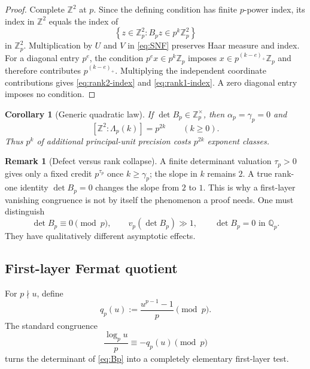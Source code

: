\documentclass[11pt,oneside]{article}
\newtheorem{corollary}[theorem]{Corollary}
\theoremstyle{definition}
\newtheorem{remark}[theorem]{Remark}
\newcommand{\Q}{\mathbb{Q}}
\newcommand{\Z}{\mathbb{Z}}
\newcommand{\set}[1]{\left\{#1\right\}}
\begin{document}
\begin{proof}
Complete $\Z^2$ at $p$.  Since the defining condition has finite
$p$-power index, its index in $\Z^2$ equals the index of
\[
  \set{z\in\Z_p^2:B_pz\in p^k\Z_p^2}
\]
in $\Z_p^2$.  Multiplication by $U$ and $V$ in
\eqref{eq:SNF} preserves Haar measure and index.  For a diagonal entry
$p^e$, the condition $p^ex\in p^k\Z_p$ imposes
$x\in p^{(k-e)_+}\Z_p$ and therefore contributes
$p^{(k-e)_+}$.  Multiplying the independent coordinate contributions
gives \eqref{eq:rank2-index} and \eqref{eq:rank1-index}.  A zero diagonal
entry imposes no condition.
\end{proof}

\begin{corollary}[Generic quadratic law]\label{cor:generic-quadratic}
If $\det B_p\in\Z_p^\times$, then $\alpha_p=\gamma_p=0$ and
\begin{equation}\label{eq:generic-index}
  [\Z^2:\Lambda_p(k)]=p^{2k}
  \qquad(k\ge0).
\end{equation}
Thus $p^k$ of additional principal-unit precision costs $p^{2k}$ exponent
classes.
\end{corollary}

\begin{remark}[Defect versus rank collapse]\label{rem:defect-rank}
A finite determinant valuation $\tau_p>0$ gives only a fixed credit
$p^{\tau_p}$ once $k\ge\gamma_p$; the slope in $k$ remains $2$.  A true
rank-one identity $\det B_p=0$ changes the slope from $2$ to $1$.  This is
why a first-layer vanishing congruence is not by itself the phenomenon a
proof needs.  One must distinguish
\[
  \det B_p\equiv0\pmod p,
  \qquad v_p(\det B_p)\gg1,
  \qquad \det B_p=0\text{ in }\Q_p.
\]
They have qualitatively different asymptotic effects.
\end{remark}

\subsection{First-layer Fermat quotient}

For $p\nmid u$, define
\begin{equation}\label{eq:fermat-q}
  q_p(u):=\frac{u^{p-1}-1}{p}\pmod p.
\end{equation}
The standard congruence
\begin{equation}\label{eq:log-fermat}
  \frac{\log_pu}{p}\equiv-q_p(u)\pmod p
\end{equation}
turns the determinant of \eqref{eq:Bp} into a completely elementary
first-layer test.
\end{document}
